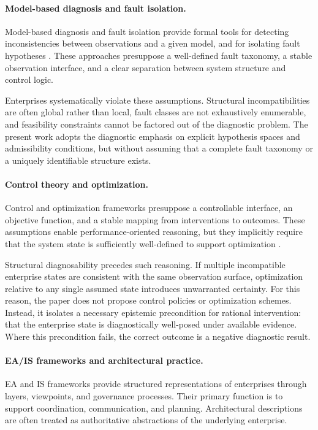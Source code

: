 \paragraph{Model-based diagnosis and fault isolation.}
Model-based diagnosis and fault isolation provide formal tools for detecting inconsistencies between observations and a given model, and for isolating fault hypotheses \cite{reiter1987_diagnosis,iserermann2005_fdi_status}.
These approaches presuppose a well-defined fault taxonomy, a stable observation interface, and a clear separation between system structure and control logic.

Enterprises systematically violate these assumptions.
Structural incompatibilities are often global rather than local, fault classes are not exhaustively enumerable, and feasibility constraints cannot be factored out of the diagnostic problem.
The present work adopts the diagnostic emphasis on explicit hypothesis spaces and admissibility conditions, but without assuming that a complete fault taxonomy or a uniquely identifiable structure exists.

\paragraph{Control theory and optimization.}
Control and optimization frameworks presuppose a controllable interface, an objective function, and a stable mapping from interventions to outcomes.
These assumptions enable performance-oriented reasoning, but they implicitly require that the system state is sufficiently well-defined to support optimization \cite{sontag1998_mathematical_control}.

Structural diagnosability precedes such reasoning.
If multiple incompatible enterprise states are consistent with the same observation surface, optimization relative to any single assumed state introduces unwarranted certainty.
For this reason, the paper does not propose control policies or optimization schemes.
Instead, it isolates a necessary epistemic precondition for rational intervention: that the enterprise state is diagnostically well-posed under available evidence.
Where this precondition fails, the correct outcome is a negative diagnostic result.

\paragraph{EA/IS frameworks and architectural practice.}
EA and IS frameworks provide structured representations of enterprises through layers, viewpoints, and governance processes.
Their primary function is to support coordination, communication, and planning.
Architectural descriptions are often treated as authoritative abstractions of the underlying enterprise.


